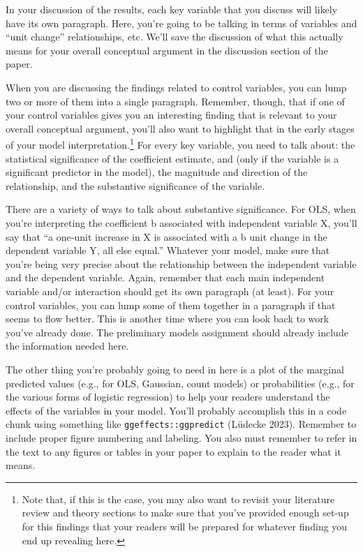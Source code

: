 \documentclass[12pt]{article}
\begin{document}
In your discussion of the results, each key variable that you discuss will likely have its own paragraph. Here, you're going to be talking in terms of variables and ``unit change'' relationships, etc. We'll save the discussion of what this actually means for your overall conceptual argument in the discussion section of the paper.

When you are discussing the findings related to control variables, you can lump two or more of them into a single paragraph. Remember, though, that if one of your control variables gives you an interesting finding that is relevant to your overall conceptual argument, you'll also want to highlight that in the early stages of your model interpretation.\footnote{Note that, if this is the case, you may also want to revisit your literature review and theory sections to make sure that you've provided enough set-up for this findings that your readers will be prepared for whatever finding you end up revealing here.} For every key variable, you need to talk about: the statistical significance of the coefficient estimate, and (only if the variable is a significant predictor in the model), the magnitude and direction of the relationship, and the substantive significance of the variable.

There are a variety of ways to talk about substantive significance. For OLS, when you're interpreting the coefficient b associated with independent variable X, you'll say that ``a one-unit increase in X is associated with a b unit change in the dependent variable Y, all else equal.'' Whatever your model, make sure that you're being very precise about the relationship between the independent variable and the dependent variable. Again, remember that each main independent variable and/or interaction should get its own paragraph (at least). For your control variables, you can lump some of them together in a paragraph if that seems to flow better. This is another time where you can look back to work you've already done. The preliminary models assignment should already include the information needed here.

The other thing you're probably going to need in here is a plot of the marginal predicted values (e.g., for OLS, Gaussian, count models) or probabilities (e.g., for the various forms of logistic regression) to help your readers understand the effects of the variables in your model. You'll probably accomplish this in a code chunk using something like \texttt{ggeffects::ggpredict} (Lüdecke 2023). Remember to include proper figure numbering and labeling. You also must remember to refer in the text to any figures or tables in your paper to explain to the reader what it means.
\end{document}
